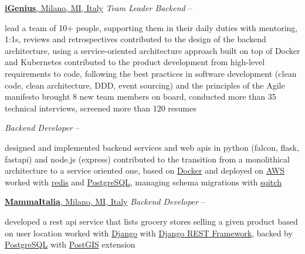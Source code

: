 \documentclass[a4paper,MMMyyyy,nonstopmode]{simpleresumecv}
\newcommand{\DoubleBigGap}{\BigGap\BigGap}
\begin{document}
\begin{Body}
      \DoubleBigGap

      \Entry
        \href{https://igenius.ai}{\textbf{iGenius}, Milano, MI, Italy}
        \Gap
        \textit{Team Leader Backend}
          \hfill
           -- 
        \Gap
        \begin{Detail}
          \Gap
          \BulletItem
            lead a team of 10+ people, supporting them in their daily duties with mentoring, 1:1s, reviews and retrospectives
          \BulletItem
            contributed to the design of the backend architecture, using a service-oriented architecture approach built on top of Docker and Kubernetes
          \BulletItem
            contributed to the product development from high-level requirements to code, following the best practices in software development (clean code, clean architecture, DDD, event sourcing) and the principles of the Agile manifesto
          \BulletItem
            brought 8 new team members on board, conducted more than 35 technical interviews, screened more than 120 resumes
        \end{Detail}

        \DoubleBigGap

        \textit{Backend Developer}
          \hfill
           -- 
        \begin{Detail}
          \Gap
          \BulletItem
            designed and implemented backend services and web apis in python (falcon, flask, fastapi) and node.js (express)
          \BulletItem
            contributed to the transition from a monolithical architecture to a service oriented one, based on \href{https://www.docker.com/}{Docker} and deployed on \href{https://aws.amazon.com/}{AWS}
          \BulletItem
            worked with \href{https://redis.io/}{redis} and \href{https://www.postgresql.org/}{PostgreSQL}, managing schema migrations with \href{https://sqitch.org/}{sqitch}
        \end{Detail}

      \DoubleBigGap

      \Entry
        \href{http://mammaitaliafood.com}{\textbf{MammaItalia}, Milano, MI, Italy}
        \Gap
        \textit{Backend Developer}
          \hfill
           -- 
        \Gap
        \begin{Detail}
          \Gap
          \BulletItem
            developed a rest api service that lists grocery stores selling a given product based on user location
          \BulletItem
            worked with \href{https://www.djangoproject.com/}{Django} with \href{https://www.django-rest-framework.org/}{Django REST Framework}, backed by \href{https://www.postgresql.org/}{PostgreSQL} with \href{https://postgis.net/}{PostGIS} extension
        \end{Detail}


\end{Body}
\end{document}
